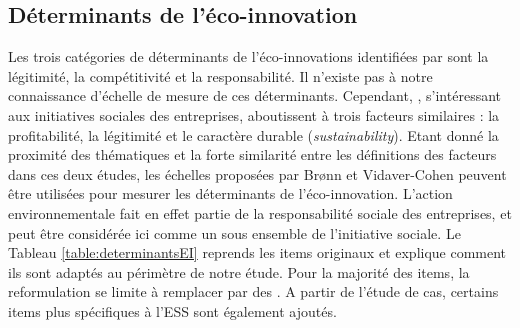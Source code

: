 \subsection{Déterminants de l’éco-innovation}

Les trois catégories de déterminants de l’éco-innovations identifiées par \textcite{bansal2000why} sont la légitimité, la compétitivité et la responsabilité. Il n’existe pas à notre connaissance d’échelle de mesure de ces déterminants. Cependant, \textcite{bronn2009corporate}, s’intéressant aux initiatives sociales des entreprises, aboutissent à trois facteurs similaires : la profitabilité, la légitimité et le caractère durable (\textit{sustainability}). Etant donné la proximité des thématiques et la forte similarité entre les définitions des facteurs dans ces deux études, les échelles proposées par Brønn et Vidaver-Cohen peuvent être utilisées pour mesurer les déterminants de l’éco-innovation. L’action environnementale fait en effet partie de la responsabilité sociale des entreprises, et peut être considérée ici comme un sous ensemble de l’initiative sociale. Le Tableau \ref{table:determinantsEI} reprends les items originaux et explique comment ils sont adaptés au périmètre de notre étude. Pour la majorité des items, la reformulation se limite à remplacer  par des . A partir de l’étude de cas, certains items plus spécifiques à l’ESS sont également ajoutés. 


